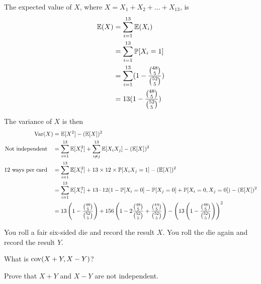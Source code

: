 \documentclass[11pt]{article}
\begin{document}
\begin{solution}
	
\begin{Parts}
		
\Part The expected value of $X$, where $X = X_1 + X_2 + \dots + X_13$, is 
\[
	\begin{split}
		\operatorname{\mathbb{E}}(X) &= \sum_{i=1}^{13} \operatorname{\mathbb{E}}(X_i) \\
		&= \sum_{i=1}^{13} \operatorname{\mathbb{P}}[X_i = 1] \\
		&= \sum_{i=1}^{13} (1 - \frac{\binom{48}{5}}{\binom{52}{5}}) \\
		&= 13 (1 - \frac{\binom{48}{5}}{\binom{52}{5}})
	\end{split}
\]

\Part The variance of $X$ is then 
\[
	\begin{split}
		\operatorname{Var}(X) &= \operatorname{\mathbb{E}}[X^2] - (\operatorname{\mathbb{E}}[X])^2 \\
		\text{Not independent} \quad &= \sum_{i=1}^{13} \operatorname{\mathbb{E}}[X_i^2] + 
		\sum_{i \neq j}^{13} \operatorname{\mathbb{E}}[X_i X_j ]  - (\operatorname{\mathbb{E}}[X])^2 \\
		\text{12 ways per card} \quad &= \sum_{i=1}^{13} \operatorname{\mathbb{E}}[X_i^2]
		+ 13 \times 12 \times \operatorname{\mathbb{P}}[X_i X_j = 1] - (\operatorname{\mathbb{E}}[X])^2 \\
		&= \sum_{i=1}^{13} \operatorname{\mathbb{E}}[X_i^2] + 
		13 \cdot 12 (1- \operatorname{\mathbb{P}}[X_i = 0] - \operatorname{\mathbb{P}}[X_j = 0] + \operatorname{\mathbb{P}}[X_i = 0, X_j = 0]) - (\operatorname{\mathbb{E}}[X])^2 \\
		&= 13 \left( 1 - \frac{\binom{48}{5}}{\binom{52}{5}} \right)
		+ 156 \left( 1 - 2 \frac{\binom{48}{5}}{\binom{52}{5}} + \frac{\binom{44}{5}}{\binom{52}{5}} \right)
		- \left(13 \left(1 - \frac{\binom{48}{5}}{\binom{52}{5}}\right) \right)^2 
	\end{split}
\]
	
\end{Parts}
	
\end{solution}	


\begin{Parts}
	\Part You roll a fair six-sided die and record the result $X$. You roll the 
	die again and record the result $Y$.  
	\begin{Parts}
		\item What is $\operatorname{cov} (X+Y, X-Y)$?
		\item Prove that $X+Y$ and $X-Y$ are not independent.
	\end{Parts}

\end{Parts}
\end{document}
